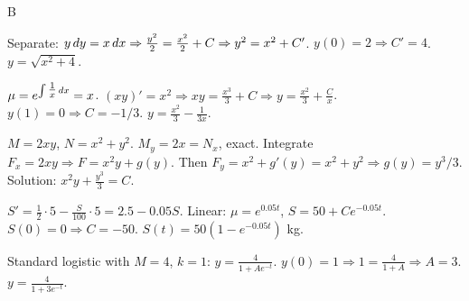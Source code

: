 \documentclass[11pt]{article}
\begin{document}
\begin{answers}{B}
\item Separate: $y \,dy = x \,dx \Rightarrow \tfrac{y^2}{2} = \tfrac{x^2}{2} + C \Rightarrow y^2 = x^2 + C'$. $y(0)=2 \Rightarrow C'=4$. $\boxed{y = \sqrt{x^2 + 4}}$.
\item $\mu = e^{\int \tfrac{1}{x} \,dx} = x$. $(xy)' = x^2 \Rightarrow xy = \tfrac{x^3}{3} + C \Rightarrow y = \tfrac{x^2}{3} + \tfrac{C}{x}$. $y(1) = 0 \Rightarrow C = -1/3$. $\boxed{y = \tfrac{x^2}{3} - \tfrac{1}{3x}}$.
\item $M = 2xy$, $N = x^2 + y^2$. $M_y = 2x = N_x$, exact. Integrate $F_x = 2xy \Rightarrow F = x^2 y + g(y)$. Then $F_y = x^2 + g'(y) = x^2 + y^2 \Rightarrow g(y) = y^3/3$. Solution: $\boxed{x^2 y + \tfrac{y^3}{3} = C}$.
\item $S' = \tfrac{1}{2} \cdot 5 - \tfrac{S}{100} \cdot 5 = 2.5 - 0.05 S$. Linear: $\mu = e^{0.05 t}$, $S = 50 + C e^{-0.05 t}$. $S(0) = 0 \Rightarrow C = -50$. $\boxed{S(t) = 50(1 - e^{-0.05 t})}$ kg.
\item Standard logistic with $M=4$, $k=1$: $y = \tfrac{4}{1 + A e^{-t}}$. $y(0) = 1 \Rightarrow 1 = \tfrac{4}{1+A} \Rightarrow A = 3$. $\boxed{y = \tfrac{4}{1 + 3 e^{-t}}}$.
\end{answers}
\end{document}
